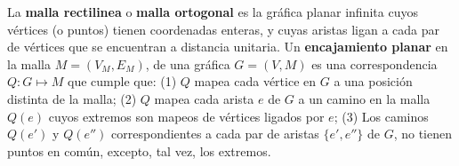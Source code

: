\begin{definition}
La \textbf{malla rectilinea} o \textbf{malla ortogonal} es la gr\'afica planar infinita cuyos v\'ertices (o puntos) tienen coordenadas enteras, y cuyas aristas ligan a cada par de v\'ertices que se encuentran a distancia unitaria. Un \textbf{encajamiento planar} en la malla $M = (V_M, E_M)$, de una gr\'afica $G = (V, M)$ es una correspondencia $Q: G\mapsto M$ que cumple que: (1) $Q$ mapea cada v\'ertice en $G$ a una posici\'on distinta de la malla; (2) $Q$ mapea cada arista $e$ de $G$ a un camino en la malla $Q(e)$ cuyos extremos son mapeos de v\'ertices ligados por $e$; (3) Los caminos $Q(e')$ y $Q(e'')$ correspondientes a cada par de aristas $\{e', e''\}$ de $G$, no tienen puntos en com\'un, excepto, tal vez, los extremos.
\end{definition}

